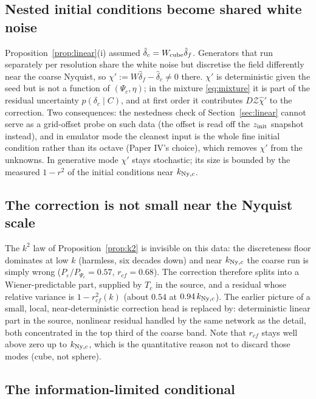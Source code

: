 \documentclass[11pt]{article}
\theoremstyle{definition}
\newcommand{\Psic}{\Psi_{c}}
\newcommand{\Ny}{{\rm Ny}}
\newcommand{\Zel}{\mathcal{Z}}
\begin{document}
\subsection{Nested initial conditions become shared white noise}

Proposition~\ref{prop:linear}(i) assumed $\hat\delta_c=W_{\rm cube}\hat\delta_f$. Generators that run separately per resolution share the white noise but discretise the field differently near the coarse Nyquist, so $\chi':=W\hat\delta_f-\hat\delta_c\neq0$ there. $\chi'$ is deterministic given the seed but is not a function of $(\Psic,\eta)$; in the mixture \eqref{eq:mixture} it is part of the residual uncertainty $p(\delta_c\mid C)$, and at first order it contributes $D\Zel\hat\chi'$ to the correction. Two consequences: the nestedness check of Section~\ref{sec:linear} cannot serve as a grid-offset probe on such data (the offset is read off the $z_{\rm init}$ snapshot instead), and in emulator mode the cleanest input is the whole fine initial condition rather than its octave (Paper IV's choice), which removes $\chi'$ from the unknowns. In generative mode $\chi'$ stays stochastic; its size is bounded by the measured $1-r^2$ of the initial conditions near $k_{\Ny,c}$.

\subsection{The correction is not small near the Nyquist scale}

The $k^2$ law of Proposition~\ref{prop:k2} is invisible on this data: the discreteness floor dominates at low $k$ (harmless, six decades down) and near $k_{\Ny,c}$ the coarse run is simply wrong ($P_\varepsilon/P_{\Psi_c}=0.57$, $r_{cf}=0.68$). The correction therefore splits into a Wiener-predictable part, supplied by $T_c$ in the source, and a residual whose relative variance is $1-r_{cf}^2(k)$ (about $0.54$ at $0.94\,k_{\Ny,c}$). The earlier picture of a small, local, near-deterministic correction head is replaced by: deterministic linear part in the source, nonlinear residual handled by the same network as the detail, both concentrated in the top third of the coarse band. Note that $r_{cf}$ stays well above zero up to $k_{\Ny,c}$, which is the quantitative reason not to discard those modes (cube, not sphere).

\subsection{The information-limited conditional}
\end{document}
